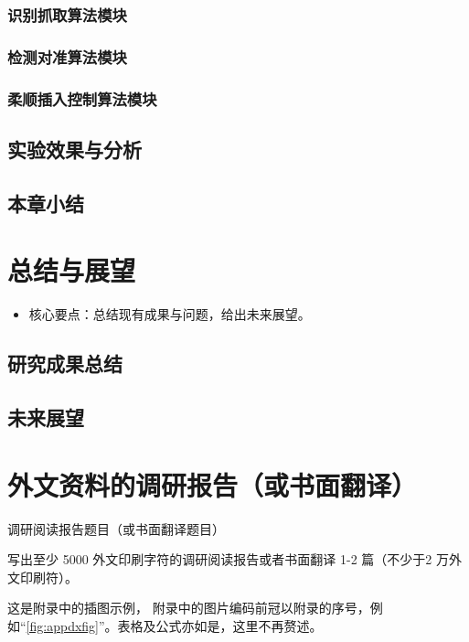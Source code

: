 \documentclass{Diploma}
\begin{document}
\subsection{识别抓取算法模块}
\subsection{检测对准算法模块}
\subsection{柔顺插入控制算法模块}
\section{实验效果与分析}
\section{本章小结}

\chapter{总结与展望}
\begin{itemize}
  \item 核心要点：总结现有成果与问题，给出未来展望。
\end{itemize}
\section{研究成果总结}
\section{未来展望}


\StartAppendix%
\chapter{外文资料的调研报告（或书面翻译）}
\begin{center}
调研阅读报告题目（或书面翻译题目）
\end{center}

写出至少 5000 外文印刷字符的调研阅读报告或者书面翻译 1-2 篇（不少于2 万外文印刷符）。

这是附录中的插图示例，
%
附录中的图片编码前冠以附录的序号，例如“\ref{fig:appdxfig}”。表格及公式亦如是，这里不再赘述。
\end{document}

